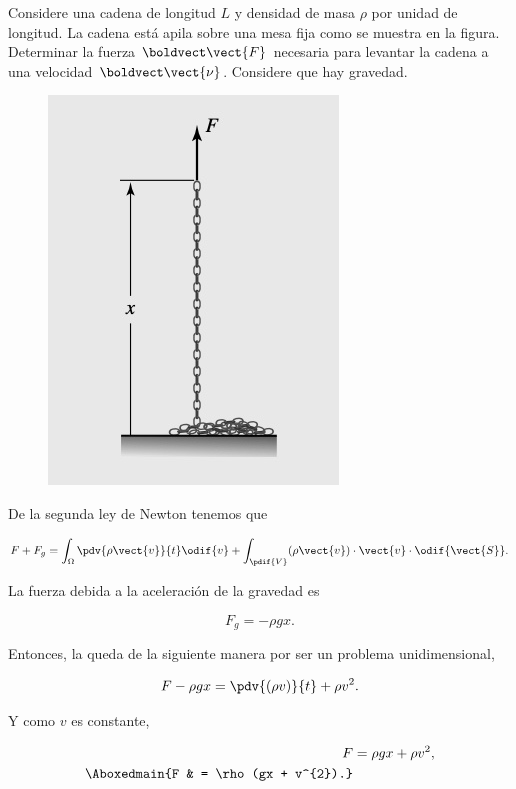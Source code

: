 \documentclass[../main.tex]{subfiles}
\begin{document}
\begin{problema}
	Considere una cadena de longitud \(L\) y densidad de masa \(\rho\) por
	unidad de longitud. La cadena está apila sobre una mesa fija como
	se muestra en la figura. Determinar la fuerza \(\boldvect\vect{F}\)
	necesaria para levantar la cadena a una velocidad \(\boldvect\vect{\nu}\). Considere
	que hay gravedad.

	\begin{figure}[htb]
		\centering
		\includegraphics[width=.3\textwidth]{figs/problema01-000.jpg}
	\end{figure}
\end{problema}

\startsolution

De la segunda ley de Newton tenemos que

\begin{equation}
	F + F_{g} = \int_{\Omega} \pdv{\rho \vect{v}}{t} \odif{v} + \int_{\pdif{V}} (\rho \vect{v})\cdot \vect{v} \cdot \odif{\vect{S}}.
	\label{eq:NewtonSecondLaw}
\end{equation}

La fuerza debida a la aceleración de la gravedad es

\begin{equation*}
	F_{g} = -\rho gx.
\end{equation*}

Entonces, la  queda de la siguiente manera por
ser un problema unidimensional,

\begin{equation*}
	F - \rho gx = \pdv{(\rho v)}{t} + \rho v^{2}.
\end{equation*}

Y como \(v\) es constante,

\begin{align*}
	F             & = \rho gx + \rho v^{2}, \\
	\Aboxedmain{F & = \rho(gx + v^{2}).}
\end{align*}
\end{document}
